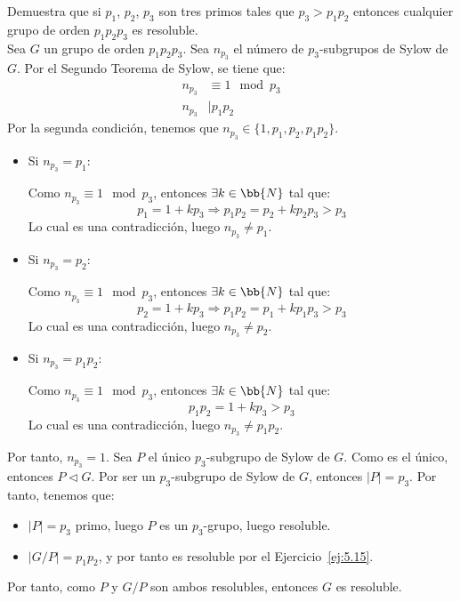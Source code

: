 \begin{ejercicio}\label{ej:5.16}
    Demuestra que si $p_1$, $p_2$, $p_3$ son tres primos tales que $p_3 > p_1 p_2$ entonces cualquier grupo de orden $p_1 p_2 p_3$ es resoluble.\\


    Sea $G$ un grupo de orden $p_1 p_2 p_3$. Sea $n_{p_3}$ el número de $p_3$-subgrupos de Sylow de $G$. Por el Segundo Teorema de Sylow, se tiene que:
    \begin{align*}
        n_{p_3} &\equiv 1 \mod p_3 \\
        n_{p_3} &\mid p_1 p_2
    \end{align*}
    Por la segunda condición, tenemos que $n_{p_3}\in \{1,p_1,p_2,p_1p_2\}$.
    \begin{itemize}
        \item Si $n_{p_3}=p_1$:
        
        Como $n_{p_3}\equiv 1 \mod p_3$, entonces $\exists k\in\bb{N}$ tal que:
        \begin{equation*}
            p_1 = 1 + k p_3\Longrightarrow p_1p_2 = p_2 + k p_2 p_3>p_3
        \end{equation*}
        Lo cual es una contradicción, luego $n_{p_3}\neq p_1$.
        \item Si $n_{p_3}=p_2$:
        
        Como $n_{p_3}\equiv 1 \mod p_3$, entonces $\exists k\in\bb{N}$ tal que:
        \begin{equation*}
            p_2 = 1 + k p_3\Longrightarrow p_1p_2 = p_1 + k p_1 p_3>p_3
        \end{equation*}
        Lo cual es una contradicción, luego $n_{p_3}\neq p_2$.

        \item Si $n_{p_3}=p_1p_2$:
        
        Como $n_{p_3}\equiv 1 \mod p_3$, entonces $\exists k\in\bb{N}$ tal que:
        \begin{equation*}
            p_1p_2 = 1 + k p_3 > p_3
        \end{equation*}
        Lo cual es una contradicción, luego $n_{p_3}\neq p_1p_2$.
    \end{itemize}

    Por tanto, $n_{p_3}=1$. Sea $P$ el único $p_3$-subgrupo de Sylow de $G$. Como es el único, entonces $P\lhd G$. Por ser un $p_3$-subgrupo de Sylow de $G$, entonces $|P|=p_3$. Por tanto, tenemos que:
    \begin{itemize}
        \item $|P|=p_3$ primo, luego $P$ es un $p_3$-grupo, luego resoluble.
        \item $|G/P|=p_1 p_2$, y por tanto es resoluble por el Ejercicio~\ref{ej:5.15}.
    \end{itemize}
    Por tanto, como $P$ y $G/P$ son ambos resolubles, entonces $G$ es resoluble.
\end{ejercicio}

